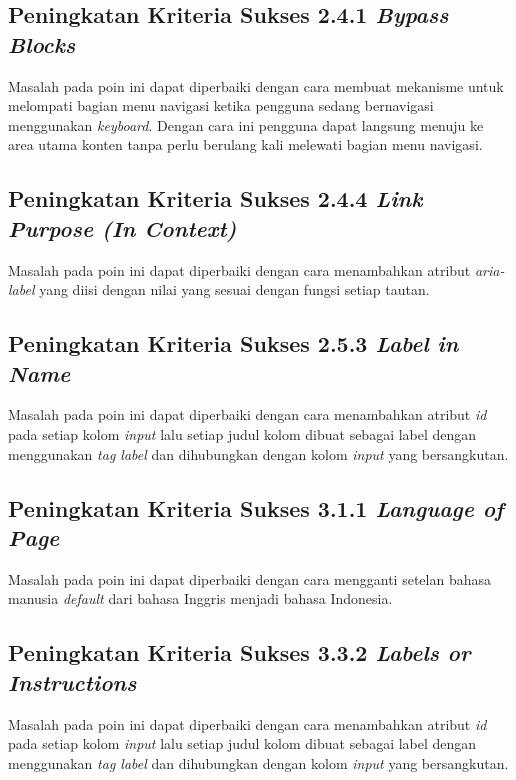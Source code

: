 \subsection{Peningkatan Kriteria Sukses 2.4.1 \textit{Bypass Blocks}}
\label{subsec:peningkatan_kriteria_sukses_2.4.1}
Masalah pada poin ini dapat diperbaiki dengan cara membuat mekanisme untuk melompati bagian menu navigasi ketika pengguna sedang bernavigasi menggunakan \textit{keyboard}. Dengan cara ini pengguna dapat langsung menuju ke area utama konten tanpa perlu berulang kali melewati bagian menu navigasi.

\subsection{Peningkatan Kriteria Sukses 2.4.4 \textit{Link Purpose (In Context)}}
\label{subsec:peningkatan_kriteria_sukses_2.4.4}
Masalah pada poin ini dapat diperbaiki dengan cara menambahkan atribut \textit{aria-label} yang diisi dengan nilai yang sesuai dengan fungsi setiap tautan.

\subsection{Peningkatan Kriteria Sukses 2.5.3 \textit{Label in Name}}
\label{subsec:peningkatan_kriteria_sukses_2.5.3}
Masalah pada poin ini dapat diperbaiki dengan cara menambahkan atribut \textit{id} pada setiap kolom \textit{input} lalu setiap judul kolom dibuat sebagai label dengan menggunakan \textit{tag label} dan dihubungkan dengan kolom \textit{input} yang bersangkutan.

\subsection{Peningkatan Kriteria Sukses 3.1.1 \textit{Language of Page}}
\label{subsec:peningkatan_kriteria_sukses_3.1.1}
Masalah pada poin ini dapat diperbaiki dengan cara mengganti setelan bahasa manusia \textit{default} dari bahasa Inggris menjadi bahasa Indonesia.

\subsection{Peningkatan Kriteria Sukses 3.3.2 \textit{Labels or Instructions}}
\label{subsec:peningkatan_kriteria_sukses_3.3.2}
Masalah pada poin ini dapat diperbaiki dengan cara menambahkan atribut \textit{id} pada setiap kolom \textit{input} lalu setiap judul kolom dibuat sebagai label dengan menggunakan \textit{tag label} dan dihubungkan dengan kolom \textit{input} yang bersangkutan.

